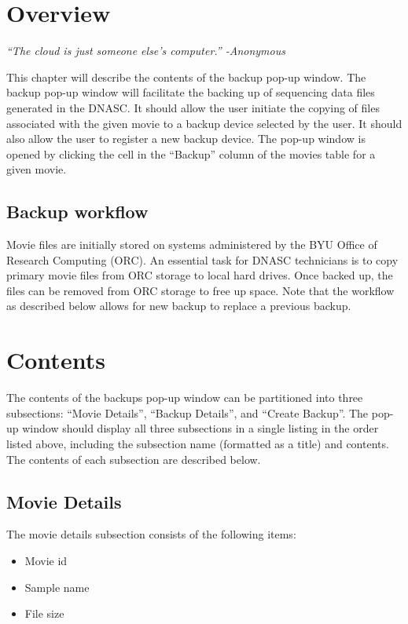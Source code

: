 
\section{Overview}

\vspace{3mm}
\emph{``The cloud is just someone else's computer.'' -Anonymous}
\vspace{3mm}

\noindent This chapter will describe the contents of the backup pop-up window.
The backup pop-up window will facilitate the backing up of sequencing data files 
generated in the DNASC. It should allow the user initiate the copying of
files associated with the given movie to a backup device selected by the user.
It should also allow the user to register a new backup device. The pop-up window 
is opened by clicking the cell in the ``Backup'' column of the movies table for a 
given movie.

\subsection{Backup workflow}
Movie files are initially stored on systems administered by the BYU Office of 
Research Computing (ORC). An essential task for DNASC technicians is to copy primary 
movie files from ORC storage to local hard drives. Once backed up, the files can be 
removed from ORC storage to free up space. Note that the workflow as described below
allows for new backup to replace a previous backup.

\section{Contents}

The contents of the backups pop-up window can be partitioned into three subsections: 
``Movie Details'', ``Backup Details'', and ``Create Backup''. The pop-up window should 
display all three subsections in a single listing in the order listed above, including 
the subsection name (formatted as a title) and contents. The contents of each subsection 
are described below. 

\subsection{Movie Details}

The movie details subsection consists of the following items:
\begin{itemize}\itemsep1pt
  \item Movie id
  \item Sample name
  \item File size
\end{itemize}

